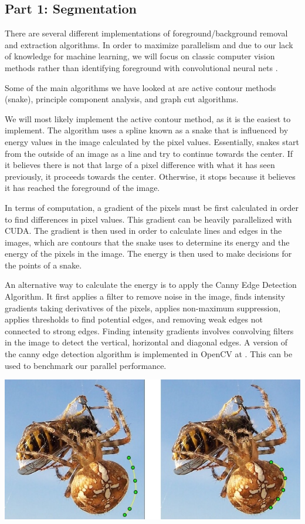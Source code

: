\documentclass[12pt]{article}
\begin{document}
\subsection*{Part 1: Segmentation}
There are several different implementations of foreground/background removal
and extraction algorithms. In order to maximize parallelism and due to our lack
of knowledge for machine learning, we will focus on classic computer vision
methods rather than identifying foreground with convolutional neural nets
\cite{pixel-ml}.

Some of the main algorithms we have looked at are active contour methods
(snake), principle component analysis, and graph cut algorithms.

We will most likely implement the active contour method, as it is the easiest
to implement. The algorithm uses a spline known as a snake that is influenced
by energy values in the image calculated by the pixel values. Essentially,
snakes start from the outside of an image as a line and try to continue towards
the center. If it believes there is not that large of a pixel difference with
what it has seen previously, it proceeds towards the center. Otherwise, it
stops because it believes it has reached the foreground of the image.

In terms of computation, a gradient of the pixels must be first calculated in
order to find differences in pixel values. This gradient can be heavily
parallelized with CUDA. The gradient is then used in order to calculate lines
and edges in the images, which are contours that the snake uses to determine
its energy and the energy of the pixels in the image. The energy is then used
to make decisions for the points of a snake.

An alternative way to calculate the energy is to apply the Canny Edge Detection
Algorithm. \cite{canny-edge} It first applies a filter to remove noise in the
image, finds intensity gradients taking derivatives of the pixels,
applies non-maximum suppression, applies thresholds to find potential edges,
and removing weak edges not connected to strong edges. Finding intensity
gradients involves convolving filters in the image to detect the vertical,
horizontal and diagonal edges. A version of the canny edge detection algorithm
is implemented in OpenCV at \cite{canny-edge}. This can be used to benchmark
our parallel performance.

\begin{center}
\includegraphics[scale=0.5]{snake-contour-example.jpg}
\cite{contour-model}
\end{center}
\end{document}
